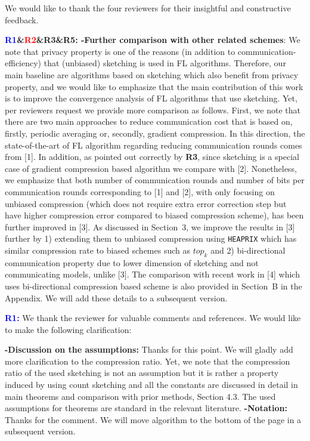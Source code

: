 \documentclass{article}
\begin{document}
We would like to thank the four reviewers for their insightful and constructive feedback. 

\textbf{\textcolor{blue}{R1}\&\textcolor{red}{R2}\&\textbf{\color{yellow!50!black}R3}\&\textbf{\textcolor{green!50!black}{R5:}} -Further comparison with other related schemes}: We note that privacy property is one of the reasons (in addition to communication-efficiency) that (unbiased) sketching is used in FL algorithms. Therefore, our main baseline are algorithms based on sketching which also {benefit from privacy property}, and we would like to emphasize that the main contribution of this work is to improve the convergence analysis of FL algorithms that use sketching. Yet, per reviewers request we provide more comparison as follows. 
First, we note that there are two main approaches to reduce communication cost that is based on, firstly, periodic averaging or, secondly, gradient compression. In this direction, the state-of-the-art of FL algorithm regarding reducing communication rounds comes from [1]. 
In addition, as pointed out correctly by \textbf{\textcolor{yellow!50!black}{R3}}, since sketching is a special case of gradient compression based algorithm we compare with [2]. 
Nonetheless, we emphasize that both number of communication rounds and number of bits per communication rounds corresponding to [1] and [2], \textcolor{red!50!black}{with only focusing on unbiased compression (which does not require extra error correction step but have higher compression error compared to biased compression scheme)}, has been further improved in [3]. 
As discussed in Section~3, we improve the results in [3] further by \textcolor{red!50!black}{1)  extending them to unbiased compression using \texttt{HEAPRIX} which has similar compression rate to biased schemes such as $top_k$} and \textcolor{red!50!black}{2)  bi-directional communication property due to lower dimension of sketching and not communicating models, unlike [3]}.  
The comparison with recent work in [4] which uses bi-directional compression based scheme is also provided in Section~B in the Appendix. We will add these details to a subsequent version.




\textbf{\textcolor{blue}{R1:}} We thank the reviewer for valuable comments and references. We would like to make the following clarification:\vspace{-1.5pt} 


\textbf{-Discussion on the assumptions:} Thanks for this point. We will gladly add more clarification to the compression ratio. Yet, we note that the compression ratio of the used sketching is not an assumption but it is rather a property induced by using count sketching and all the constants are discussed in detail in main theorems and comparison with prior methods, Section 4.3. 
The used assumptions for theorems are standard in the relevant literature. 
\textbf{-Notation:} Thanks for the comment. We will move algorithm to the bottom of the page in a subsequent version.
\end{document}

